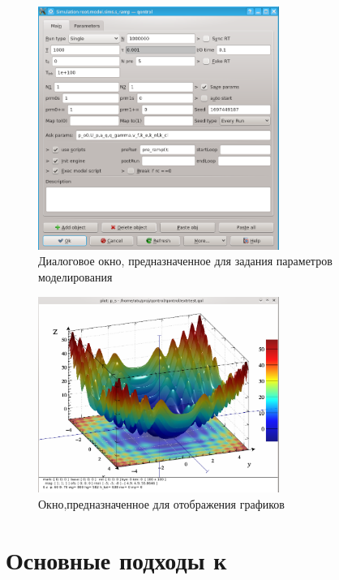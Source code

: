 \begin{figure}[htb!]
  \begin{center}
    \includegraphics[width=0.7\textwidth]{p/qontrol_task.png}
  \end{center}
  \caption{Диалоговое окно, предназначенное для задания параметров моделирования}
  \label{atu:f:qontrol_simul}
\end{figure}


\begin{figure}[htb!]
  \begin{center}
    \includegraphics[width=0.7\textwidth]{p/qontrol_3d_a.png}
  \end{center}
  \caption{Окно,предназначенное для отображения графиков}
  \label{atu:f:qontrol_3d}
\end{figure}

\section{Основные подходы к } %

